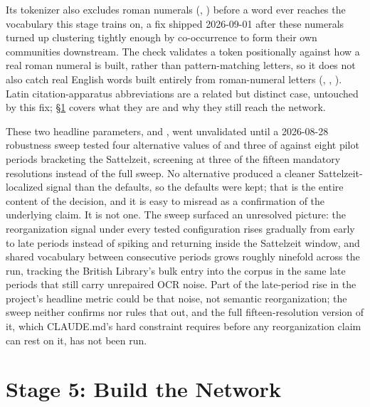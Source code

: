 \documentclass[11pt]{article}
\begin{document}
Its tokenizer also excludes roman numerals (, )
before a word ever reaches the vocabulary this stage trains on, a fix
shipped 2026-09-01 after these numerals turned up clustering tightly
enough by co-occurrence to form their own communities downstream. The
check validates a token positionally against how a real roman numeral is
built, rather than pattern-matching letters, so it does not also catch
real English words built entirely from roman-numeral letters
(, , ). Latin citation-apparatus
abbreviations are a related but distinct case, untouched by this fix;
\S\ref{sec:network} covers what they are and why they still reach the
network.

These two headline parameters,  and , went
unvalidated until a 2026-08-28 robustness sweep tested four alternative
values of  and three of  against eight
pilot periods bracketing the Sattelzeit, screening at three of the
fifteen mandatory resolutions instead of the full sweep. No alternative
produced a cleaner Sattelzeit-localized signal than the defaults, so the
defaults were kept; that is the entire content of the decision, and it
is easy to misread as a confirmation of the underlying claim. It is not
one. The sweep surfaced an unresolved picture: the reorganization signal
under every tested configuration rises gradually from early to late
periods instead of spiking and returning inside the Sattelzeit window,
and shared vocabulary between consecutive periods grows roughly ninefold
across the run, tracking the British Library's bulk entry into the
corpus in the same late periods that still carry unrepaired OCR noise.
Part of the late-period rise in the project's headline metric could be
that noise, not semantic reorganization; the sweep neither confirms nor
rules that out, and the full fifteen-resolution version of it, which
CLAUDE.md's hard constraint requires before any reorganization claim can
rest on it, has not been run.

\section{Stage 5: Build the Network}
\label{sec:network}
\end{document}
